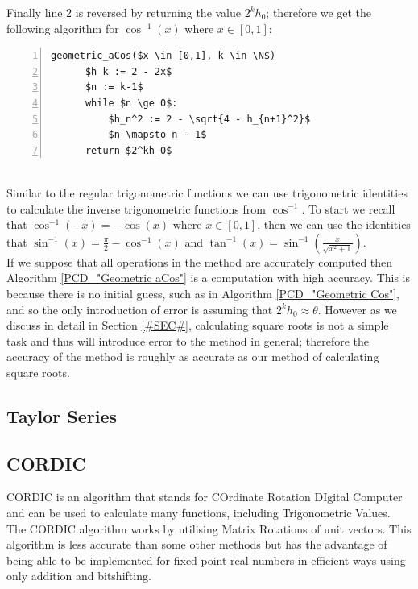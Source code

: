 {Finally line 2 is reversed by returning the value \(2^kh_0\); therefore we get the following algorithm for \(\cos^{-1}(x)\) where \(x \in [0,1]\):

\begin{lstlisting}[numbers=left,frame=single,mathescape,caption={Geometric calculation of \(\cos^{-1}\)},label={PCD_"Geometric aCos"}]
  geometric_aCos($x \in [0,1], k \in \N$)
      $h_k := 2 - 2x$
      $n := k-1$
      while $n \ge 0$:
          $h_n^2 := 2 - \sqrt{4 - h_{n+1}^2}$
          $n \mapsto n - 1$
      return $2^kh_0$
\end{lstlisting}\\

Similar to the regular trigonometric functions we can use trigonometric identities to calculate the inverse trigonometric functions from \(\cos^{-1}\). To start we recall that \(\cos^{-1}(-x) = -\cos(x)\) where \(x \in [0,1]\), then we can use the identities that \(\sin^{-1}(x) = \frac{\pi}{2} - \cos^{-1}(x)\) and \(\tan^{-1}(x) = \sin^{-1}(\frac{x}{\sqrt{x^2 + 1}})\).\\

If we suppose that all operations in the method are accurately computed then Algorithm \ref{PCD_"Geometric aCos"} is a computation with high accuracy. This is because there is no initial guess, such as in Algorithm \ref{PCD_"Geometric Cos"}, and so the only introduction of error is assuming that \(2^kh_0 \approx \theta\). However as we discuss in detail in Section \ref{#SEC#}, calculating square roots is not a simple task and thus will introduce error to the method in general; therefore the accuracy of the method is roughly as accurate as our method of calculating square roots.

\subsection{Taylor Series}
\subsection{CORDIC}
CORDIC is an algorithm that stands for COrdinate Rotation DIgital Computer and can be used to calculate many functions, including Trigonometric Values. The CORDIC algorithm works by utilising Matrix Rotations of unit vectors. This algorithm is less accurate than some other methods but has the advantage of being able to be implemented for fixed point real numbers in efficient ways using only addition and bitshifting.\\

}
